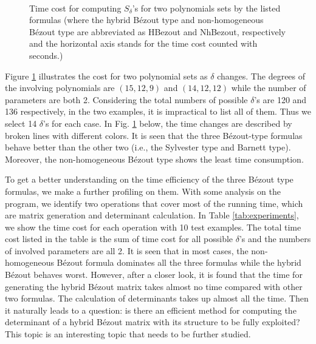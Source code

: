 \documentclass{article}
\begin{document}
\begin{figure}[H]
\centering
{}
\\ %
\centering
{}
\caption{Time cost for computing $S_{\delta}$'s for two polynomials sets  by the listed formulas (where the hybrid B\'ezout type and non-homogeneous B\'ezout type are abbreviated as HBezout and NhBezout, respectively and the horizontal axis stands for the time cost counted with seconds.)  }\label{fig:comparison}
\end{figure}

Figure \ref{fig:comparison} illustrates the cost for two polynomial sets as $\delta$ changes. The degrees of the involving polynomials are $(15, 12, 9)$ and $(14, 12, 12)$ while
the number of parameters are both 2.
Considering the total numbers of possible $\delta$'s are 120 and 136 respectively, in the two examples, it is impractical to list all of them. Thus we select 14 $\delta$'s for each case. In Fig. \ref{fig:comparison} below, the time changes are described by broken lines with different colors. It is seen that the three B\'ezout-type formulas behave better than the other two (i.e., the Sylvester type and Barnett type). Moreover, the non-homogeneous B\'ezout type shows the least time consumption.

To get a better understanding on the time efficiency of the three B\'ezout type formulas, we make a further profiling on them. With some analysis on the program, we identify two operations that cover most of the running time,
which are matrix generation and determinant calculation. In Table \ref{tab:experiments},
we show the time cost for each operation with 10 test examples.
The total time cost listed in the table is the sum of time cost for all possible $\delta$'s and the numbers of involved parameters are all 2. It is seen that in most cases, the non-homogeneous B\'ezout formula dominates all the three formulas while the hybrid B\'ezout behaves worst. However, after a closer look, it is found that the time for generating the hybrid B\'ezout matrix takes almost no time compared with other two formulas. The calculation of determinants takes up almost all the time. Then it naturally leads to a question: is there an efficient method for computing the determinant of a hybrid B\'ezout matrix with its structure to be fully exploited?
This
topic is an interesting topic that needs to be further studied.
\end{document}
